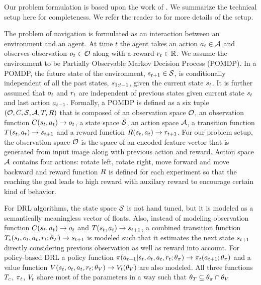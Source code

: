Our problem formulation is based upon the work of \cite{MiPaViICLR2017}. We summarize the technical setup here for completeness.
We refer the reader to \cite{MnBaMiICML2016,MiPaViICLR2017} for more details of the setup.

The problem of navigation is formulated as an interaction between an environment and an agent.
At time $t$ the agent takes an action $a_t \in \mathcal{A}$ and observes observation $o_t \in \mathcal{O}$ along with a reward $r_t \in \mathbb{R}$.
We assume the environment to be Partially Observable Markov Decision Process (POMDP).
In a POMDP, the future state of the environment, $s_{t+1} \in \mathcal{S}$, is conditionally independent of all the past states, $s_{1:t-1}$, given the current state $s_t$. It is further assumed that
$o_t$ and $r_t$ are independent of previous states given current state $s_t$ and last action $a_{t-1}$.
Formally, a POMDP is defined as a six tuple $(\mathcal{O}, C, \mathcal{S}, \mathcal{A}, T, R)$ that is composed of an observation space $\mathcal{O}$, an observation function $C(s_t, a_t) \rightarrow o_t$, a state space $\mathcal{S}$, an action space $\mathcal{A}$, a transition function $T(s_t, a_t) \rightarrow s_{t+1}$ and a reward function $R(s_t, a_t) \rightarrow r_{t+1}$.
For our problem setup, the observation space $\mathcal{O}$ is the space of an encoded feature vector that is generated from input image along with previous action and reward.
Action space $\mathcal{A}$ contains four actions: rotate left, rotate right, move forward and move backward and reward function $R$ is defined for each experiment so that the reaching the goal leads to high reward with auxilary reward to encourage certain kind of behavior.

For DRL algorithms, the state space $\mathcal{S}$ is not hand tuned, but it is modeled as a semantically meaningless vector of floats.
Also, instead of modeling observation function $C(s_t, a_t) \rightarrow o_t$ and $T(s_t, a_t) \rightarrow s_{t+1}$, a combined transition function $T_c(s_t, o_t, a_t, r_t; \theta_T) \rightarrow s_{t+1}$ is modeled such that it estimates the next state $s_{t+1}$ directly considering previous observation as well as reward into account.
For policy-based DRL a policy function $\pi(a_{t+1}|s_t, o_t, a_t, r_t; \theta_\pi) \rightarrow \pi_t(a_{t+1} ; \theta_\pi)$ and a value function $V(s_t, o_t, a_t, r_t; \theta_V) \rightarrow V_t(\theta_V)$ are also modeled.
All three functions $T_c$, $\pi_t$, $V_t$ share most of the parameters in a way such that $\theta_T \subseteq \theta_{\pi} \cap \theta_V$

